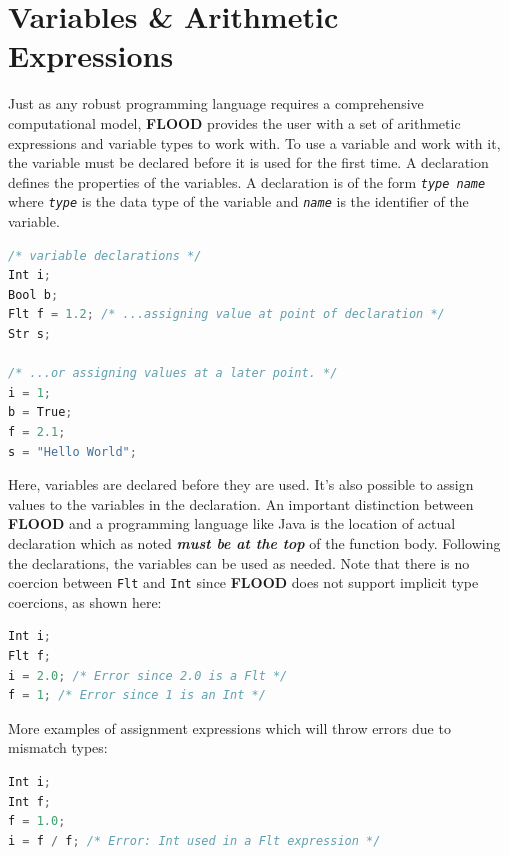 \documentclass[12pt]{report}
\begin{document}
\section{Variables \& Arithmetic Expressions}

Just as any robust programming language requires a comprehensive computational model, \textbf{FLOOD} provides the user with a set of arithmetic expressions and variable types to work with. To use a variable and work with it, the variable must be declared before it is used for the first time. A declaration defines the properties of the variables. A declaration is of the form \textit{\texttt{type name}} where \textit{\texttt{type}} is the data type of the variable and \textit{\texttt{name}} is the identifier of the variable.

\begin{singlespace}
\begin{lstlisting}[language=Java,label=some-code,caption={Variable declarations.}]
/* variable declarations */
Int i;
Bool b;
Flt f = 1.2; /* ...assigning value at point of declaration */
Str s;

/* ...or assigning values at a later point. */
i = 1;
b = True;
f = 2.1;
s = "Hello World";
\end{lstlisting}
\end{singlespace}

Here, variables are declared before they are used. It's also possible to assign values to the variables in the declaration. An important distinction between \textbf{FLOOD} and a programming language like Java is the location of actual declaration which as noted \textit{\textbf{must be at the top}} of the function body. Following the declarations, the variables can be used as needed. Note that there is no coercion between \texttt{Flt} and \texttt{Int} since \textbf{FLOOD} does not support implicit type coercions, as shown here:

\begin{singlespace}
\begin{lstlisting}[language=Java,label=some-code,caption={Implicit type coersion is not supported.}]
Int i;
Flt f;
i = 2.0; /* Error since 2.0 is a Flt */
f = 1; /* Error since 1 is an Int */
\end{lstlisting}
\end{singlespace}

More examples of assignment expressions which will throw errors due to mismatch types:

\begin{singlespace}
\begin{lstlisting}[language=Java,label=some-code,caption=More errors due to mistmatch type declarations and assignments]
Int i;
Int f;
f = 1.0;
i = f / f; /* Error: Int used in a Flt expression */
\end{lstlisting}
\end{singlespace}
\end{document}
